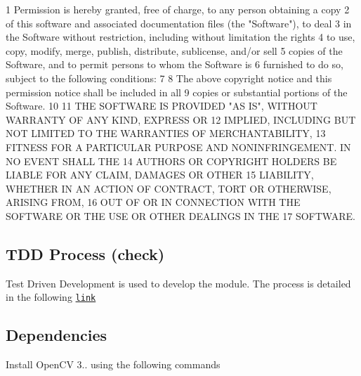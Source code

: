 \begin{DoxyCode}
1 Permission is hereby granted, free of charge, to any person obtaining a copy
2 of this software and associated documentation files (the "Software"), to deal
3 in the Software without restriction, including without limitation the rights
4 to use, copy, modify, merge, publish, distribute, sublicense, and/or sell
5 copies of the Software, and to permit persons to whom the Software is
6 furnished to do so, subject to the following conditions:
7 
8 The above copyright notice and this permission notice shall be included in all
9 copies or substantial portions of the Software.
10 
11 THE SOFTWARE IS PROVIDED "AS IS", WITHOUT WARRANTY OF ANY KIND, EXPRESS OR
12 IMPLIED, INCLUDING BUT NOT LIMITED TO THE WARRANTIES OF MERCHANTABILITY,
13 FITNESS FOR A PARTICULAR PURPOSE AND NONINFRINGEMENT. IN NO EVENT SHALL THE
14 AUTHORS OR COPYRIGHT HOLDERS BE LIABLE FOR ANY CLAIM, DAMAGES OR OTHER
15 LIABILITY, WHETHER IN AN ACTION OF CONTRACT, TORT OR OTHERWISE, ARISING FROM,
16 OUT OF OR IN CONNECTION WITH THE SOFTWARE OR THE USE OR OTHER DEALINGS IN THE
17 SOFTWARE.
\end{DoxyCode}


\subsection*{T\+DD Process (check)}

Test Driven Development is used to develop the module. The process is detailed in the following \href{https://docs.google.com/spreadsheets/d/1EZE9dxY_vlz4glKEceYtc5kQ3OyYQjs5Zh9BSKF8AoA/edit?usp=sharing}{\tt link}

\subsection*{Dependencies}

Install Open\+CV 3.. using the following commands

